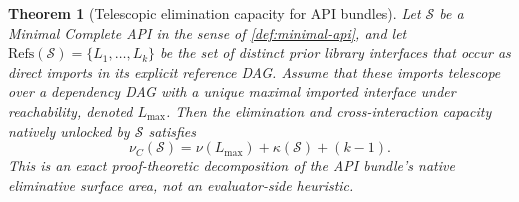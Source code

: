 \documentclass[11pt,a4paper]{article}
\theoremstyle{plain}
\newtheorem{theorem}{Theorem}[section]
\theoremstyle{definition}
\theoremstyle{remark}
\begin{document}
\begin{theorem}[Telescopic elimination capacity for API bundles]
\label{thm:telescopic-elimination}
Let $\mathcal{S}$ be a Minimal Complete API in the sense of \cref{def:minimal-api}, and let $\mathrm{Refs}(\mathcal{S})=\{L_1,\dots,L_k\}$ be the set of distinct prior library interfaces that occur as direct imports in its explicit reference DAG.
Assume that these imports telescope over a dependency DAG with a unique maximal imported interface under reachability, denoted $L_{\max}$.
Then the elimination and cross-interaction capacity natively unlocked by $\mathcal{S}$ satisfies
\[
  \nu_C(\mathcal{S})
  =
  \nu(L_{\max}) + \kappa(\mathcal{S}) + (k-1).
\]
This is an exact proof-theoretic decomposition of the API bundle's native eliminative surface area, not an evaluator-side heuristic.
\end{theorem}
\end{document}

